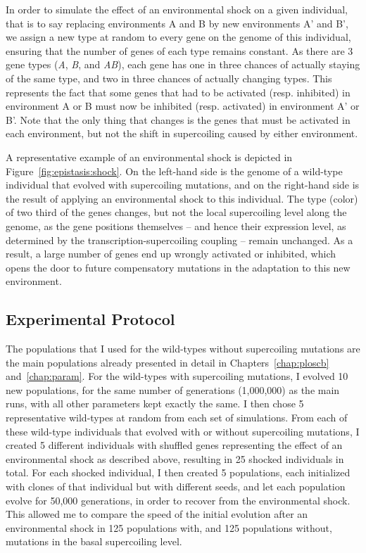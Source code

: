 In order to simulate the effect of an environmental shock on a given individual, that is to say replacing environments A and B by new environments A' and B', we assign a new type at random to every gene on the genome of this individual, ensuring that the number of genes of each type remains constant.
As there are 3 gene types (\emph{A}, \emph{B}, and \emph{AB}), each gene has one in three chances of actually staying of the same type, and two in three chances of actually changing types.
This represents the fact that some genes that had to be activated (resp. inhibited) in environment A or B must now be inhibited (resp. activated) in environment A' or B'.
Note that the only thing that changes is the genes that must be activated in each environment, but not the shift in supercoiling caused by either environment.

A representative example of an environmental shock is depicted in Figure~\ref{fig:epistasis:shock}.
On the left-hand side is the genome of a wild-type individual that evolved with supercoiling mutations, and on the right-hand side is the result of applying an environmental shock to this individual.
The type (color) of two third of the genes changes, but not the local supercoiling level along the genome, as the gene positions themselves -- and hence their expression level, as determined by the transcription-supercoiling coupling -- remain unchanged.
As a result, a large number of genes end up wrongly activated or inhibited, which opens the door to future compensatory mutations in the adaptation to this new environment.

\subsection{Experimental Protocol}

The populations that I used for the wild-types without supercoiling mutations are the main populations already presented in detail in Chapters~\ref{chap:ploscb} and~\ref{chap:param}.
For the wild-types with supercoiling mutations, I evolved 10 new populations, for the same number of generations (1,000,000) as the main runs, with all other parameters kept exactly the same.
I then chose 5 representative wild-types at random from each set of simulations.
From each of these wild-type individuals that evolved with or without supercoiling mutations, I created 5 different individuals with shuffled genes representing the effect of an environmental shock as described above, resulting in 25 shocked individuals in total.
For each shocked individual, I then created 5 populations, each initialized with clones of that individual but with different seeds, and let each population evolve for 50,000 generations, in order to recover from the environmental shock.
This allowed me to compare the speed of the initial evolution after an environmental shock in 125 populations with, and 125 populations without, mutations in the basal supercoiling level.


